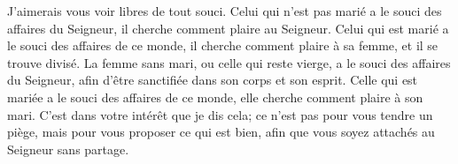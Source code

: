 J’aimerais vous voir libres de tout souci.
Celui qui n’est pas marié a le souci des affaires du Seigneur,
	il cherche comment plaire au Seigneur.
Celui qui est marié a le souci des affaires de ce monde,
	il cherche comment plaire à sa femme, et il se trouve divisé.
La femme sans mari, ou celle qui reste vierge, a le souci des affaires du Seigneur,
	afin d’être sanctifiée dans son corps et son esprit.
Celle qui est mariée a le souci des affaires de ce monde,
	elle cherche comment plaire à son mari.
C’est dans votre intérêt que je dis cela;
	ce n’est pas pour vous tendre un piège, mais pour vous proposer ce qui est bien,
	afin que vous soyez attachés au Seigneur sans partage.
